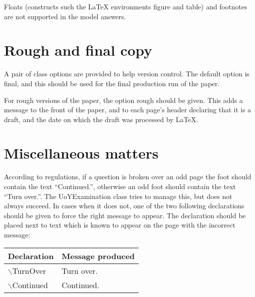 \documentclass[12pt,twoside]{article}
\newcommand{\kwd}[1]{\textsf{#1}}
\newcommand{\cmd}[1]{$\backslash$\textsf{#1}}
\begin{document}
Floats (constructs such the \LaTeX{} environments \kwd{figure} and
\kwd{table}) and footnotes are not supported in the model answers.

\section{Rough and final copy}
A pair of class options are provided to help version control.  The
default option is \kwd{final}, and this should be used for the final
production run of the paper.

For rough versions of the paper, the option \kwd{rough} should be
given.  This adds a message to the front of the paper, and to each
page's header declaring that it is a draft, and the date on which the
draft was processed by \LaTeX.

\section{Miscellaneous matters}
According to regulations, if a question is broken over an odd page the
foot should contain the text ``Continued.'', otherwise an odd foot
should contain the text ``Turn over.''.  The \kwd{UoYExamination}
class tries to manage this, but does not always succeed.  In cases
when it does not, one of the two following declarations should be
given to force the right message to appear.  The declaration should be
placed next to text which is known to appear on the page with the
incorrect message:
\begin{center}
\begin{tabular}{l|l}
Declaration&Message produced\\
\hline
\cmd{TurnOver}&Turn over.\\
\cmd{Continued}&Continued.
\end{tabular}
\end{center}


\end{document}
